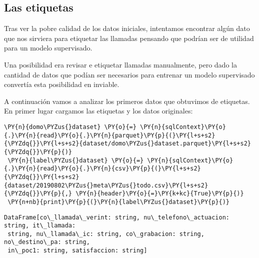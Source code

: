  
 \subsection{Las etiquetas}
 
 Tras ver la pobre calidad de los datos iniciales, intentamos encontrar algún dato que nos sirviera para etiquetar las llamadas pensando que podrían ser de utilidad para un modelo supervisado. 
 
 Una posibilidad era revisar e etiquetar llamadas manualmente, pero dado la cantidad de datos que podían ser necesarios para entrenar un modelo supervisado convertía esta posibilidad en inviable.
 
 A continuación vamos a analizar los primeros datos que obtuvimos de etiquetas. En primer lugar cargamos las etiquetas y los datos originales:  
 \vspace{0.5cm}
 
   \begin{tcolorbox}[breakable, size=fbox, boxrule=1pt, pad at break*=1mm,colback=cellbackground, colframe=cellborder]
 \begin{Verbatim}[commandchars=\\\{\}]
 \PY{n}{domo\PYZus{}dataset} \PY{o}{=} \PY{n}{sqlContext}\PY{o}{.}\PY{n}{read}\PY{o}{.}\PY{n}{parquet}\PY{p}{(}\PY{l+s+s2}{\PYZdq{}}\PY{l+s+s2}{dataset/domo\PYZus{}dataset.parquet}\PY{l+s+s2}{\PYZdq{}}\PY{p}{)}
 \PY{n}{label\PYZus{}dataset} \PY{o}{=} \PY{n}{sqlContext}\PY{o}{.}\PY{n}{read}\PY{o}{.}\PY{n}{csv}\PY{p}{(}\PY{l+s+s2}{\PYZdq{}}\PY{l+s+s2}{dataset/20190802\PYZus{}meta\PYZus{}todo.csv}\PY{l+s+s2}{\PYZdq{}}\PY{p}{,} \PY{n}{header}\PY{o}{=}\PY{k+kc}{True}\PY{p}{)}
 \PY{n+nb}{print}\PY{p}{(}\PY{n}{label\PYZus{}dataset}\PY{p}{)}
 \end{Verbatim}
 \end{tcolorbox}
 
     \begin{Verbatim}[commandchars=\\\{\}]
 DataFrame[co\_llamada\_verint: string, nu\_telefono\_actuacion: string, it\_llamada:
 string, nu\_llamada\_ic: string, co\_grabacion: string, no\_destino\_pa: string,
 in\_poc1: string, satisfaccion: string]
     \end{Verbatim}
     
